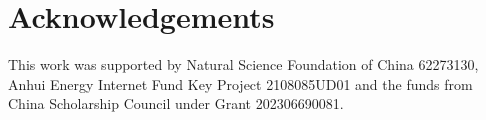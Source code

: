 \documentclass[preprint,12pt]{elsarticle}
\begin{document}


\section*{Acknowledgements}
This work was supported by Natural Science Foundation of China 62273130, Anhui Energy Internet Fund Key Project 2108085UD01 and the funds from China Scholarship Council under Grant 202306690081.
\end{document}
